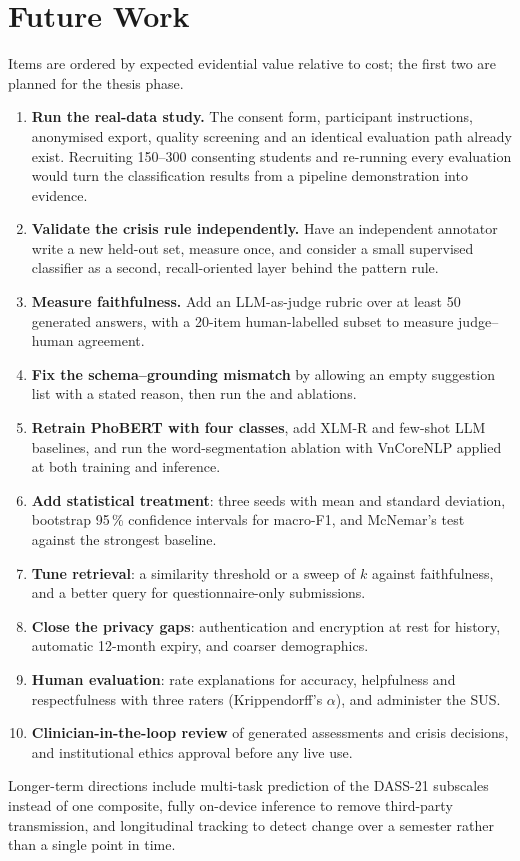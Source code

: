 \section{Future Work}
Items are ordered by expected evidential value relative to cost; the first two are planned for the thesis phase.

\begin{enumerate}
	\item \textbf{Run the real-data study.} The consent form, participant instructions, anonymised export, quality screening and an identical  evaluation path already exist. Recruiting 150--300 consenting students and re-running every evaluation would turn the classification results from a pipeline demonstration into evidence.
	\item \textbf{Validate the crisis rule independently.} Have an independent annotator write a new held-out set, measure once, and consider a small supervised classifier as a second, recall-oriented layer behind the pattern rule.
	\item \textbf{Measure faithfulness.} Add an LLM-as-judge rubric over at least 50 generated answers, with a 20-item human-labelled subset to measure judge--human agreement.
	\item \textbf{Fix the schema--grounding mismatch} by allowing an empty suggestion list with a stated reason, then run the  and  ablations.
	\item \textbf{Retrain PhoBERT with four classes}, add XLM-R and few-shot LLM baselines, and run the word-segmentation ablation with VnCoreNLP applied at both training and inference.
	\item \textbf{Add statistical treatment}: three seeds with mean and standard deviation, bootstrap 95\,\% confidence intervals for macro-F1, and McNemar's test against the strongest baseline.
	\item \textbf{Tune retrieval}: a similarity threshold or a sweep of $k$ against faithfulness, and a better query for questionnaire-only submissions.
	\item \textbf{Close the privacy gaps}: authentication and encryption at rest for history, automatic 12-month expiry, and coarser demographics.
	\item \textbf{Human evaluation}: rate explanations for accuracy, helpfulness and respectfulness with three raters (Krippendorff's $\alpha$), and administer the SUS.
	\item \textbf{Clinician-in-the-loop review} of generated assessments and crisis decisions, and institutional ethics approval before any live use.
\end{enumerate}

Longer-term directions include multi-task prediction of the DASS-21 subscales instead of one composite, fully on-device inference to remove third-party transmission, and longitudinal tracking to detect change over a semester rather than a single point in time.
